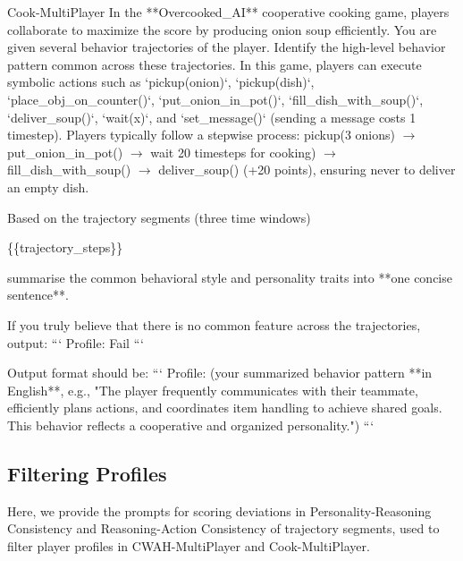 \documentclass{article}
\theoremstyle{plain}
\theoremstyle{definition}
\theoremstyle{remark}
\begin{document}
\begin{myexample}{Cook-MultiPlayer}
\ttfamily \obeylines \obeyspaces
In the **Overcooked\_AI** cooperative cooking game, players collaborate to maximize the score by producing onion soup efficiently. You are given several behavior trajectories of the player. Identify the high-level behavior pattern common across these trajectories. In this game, players can execute symbolic actions such as `pickup(onion)`, `pickup(dish)`, `place\_obj\_on\_counter()`, `put\_onion\_in\_pot()`, `fill\_dish\_with\_soup()`, `deliver\_soup()`, `wait(x)`, and `set\_message()` (sending a message costs 1 timestep). Players typically follow a stepwise process: pickup(3 onions) $\rightarrow$ put\_onion\_in\_pot() $\rightarrow$ wait 20 timesteps for cooking) $\rightarrow$ fill\_dish\_with\_soup() $\rightarrow$ deliver\_soup() (+20 points), ensuring never to deliver an empty dish.
\leavevmode\par
Based on the trajectory segments (three time windows)
\leavevmode\par
\{\{trajectory\_steps\}\}
\leavevmode\par
summarise the common behavioral style and personality traits into **one concise sentence**. 
\leavevmode\par
If you truly believe that there is no common feature across the trajectories, output:
```
Profile: Fail
```
\leavevmode\par
Output format should be:
```
Profile: (your summarized behavior pattern **in English**, e.g., "The player frequently communicates with their teammate, efficiently plans actions, and coordinates item handling to achieve shared goals. This behavior reflects a cooperative and organized personality.")
```
\end{myexample}

\subsection{Filtering Profiles}\label{apx:prompt_filter}
Here, we provide the prompts for scoring deviations in Personality-Reasoning Consistency and Reasoning-Action Consistency of trajectory segments, used to filter player profiles in CWAH-MultiPlayer and Cook-MultiPlayer.
\end{document}
